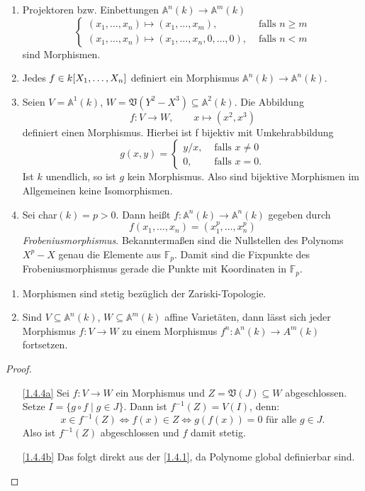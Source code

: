 \documentclass[a4paper,12pt]{scrbook}
\newtheorem{proof}{Beweis}
\def\A{\mathbb{A}}
\def\V{\mathfrak{V}}
\newcommand{\FF}{\mathbb{F}}
\newcommand{\ra}{\longrightarrow}
\renewcommand{\mapsto}{\longmapsto}
\newcommand{\polyx}[1][n]{\ensuremath%
  [X_{1},\dotsc,X_{#1}]}
\begin{document}
\begin{bsp}\label{1.4.3}
\begin{enumerate}
\item{}  Projektoren bzw. Einbettungen $\A^{n}(k)\ra \A^{m}(k)$ 
\[\begin{cases} (x_1,\dotsc,x_n) \mapsto (x_1,\dotsc,x_m),&\text{ falls }n\ge m \\ (x_1,\dotsc,x_n)\mapsto (x_1,\dotsc,x_n,0,\dotsc,0),&\text{ falls }n<m \end{cases}\] sind Morphismen.
\item{} Jedes $f \in k\polyx$ definiert ein Morphismus $\A^{n}(k)\ra \A^{n}(k)$.
\item{} Seien $V=\A^1(k)$, $W=\V(Y^2-X^3) \subseteq \A^2(k)$. Die Abbildung 
\[f\colon V\ra W, \qquad x\mapsto (x^2,x^3)\]
definiert einen Morphismus.
Hierbei ist f bijektiv mit Umkehrabbildung 
\[g(x,y)=\begin{cases} y/x,&\text{ falls }x\neq 0 \\ 0,&\text{ falls }x=0. \end{cases}\]
Ist $k$ unendlich, so ist $g$ kein Morphismus. Also sind bijektive Morphismen im Allgemeinen keine Isomorphismen.
\item{} Sei char$(k)=p>0$. Dann heißt $f\colon \A^n(k)\ra \A^n(k)$ gegeben durch 
\[f(x_1,\dotsc,x_n)=(x_1^p,\dotsc,x_n^p)\] 
\emph{Frobeniusmorphismus}. Bekanntermaßen sind die Nullstellen des Polynoms $X^{p}-X$ genau die Elemente aus $\FF_p$. Damit sind die Fixpunkte des Frobeniusmorphismus gerade die Punkte mit Koordinaten in $\FF_p$.
\end{enumerate}
\end{bsp}

\begin{bem}\label{1.4.4}
\begin{enumerate}
\item{} Morphismen sind stetig bezüglich der Zariski-Topologie.
\item{} Sind $V\subseteq \A^n(k)$, $W \subseteq \A^m(k)$ affine Varietäten, dann lässt sich jeder Morphismus $f\colon V\ra W$ zu einem Morphismus $f^n\colon \A^n(k)\ra A^m(k)$ fortsetzen.
\end{enumerate}
\end{bem}

\begin{proof}
\begin{enumerate}
\item[\ref{1.4.4a}] Sei $f\colon V\ra W$ ein Morphismus und $Z=\V(J)\subseteq W$ abgeschlossen. Setze $I=\{g\circ f \mid g\in J\}$. Dann ist $f^{-1}(Z)=V(I)$, denn: 
\[x\in f^{-1}(Z)\iff f(x)\in Z \iff g(f(x))=0\text{ für alle }g\in J.\]
Also ist $f^{-1}(Z)$ abgeschlossen und $f$ damit stetig.
\item[\ref{1.4.4b}] Das folgt direkt aus der \cref{1.4.1}, da Polynome global definierbar sind.
\end{enumerate}
\end{proof}
\end{document}
